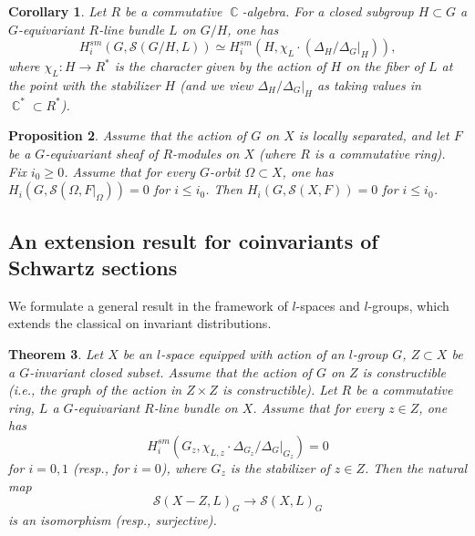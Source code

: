 \documentclass[12pt,reqno]{amsart}
\DeclareMathOperator\C{\mathbb C}
\newtheorem{theorem}{Theorem}[section]
\newtheorem{cor}[theorem]{Corollary}
\newtheorem{prop}[theorem]{Proposition}
\theoremstyle{definition}
\theoremstyle{remark}
\numberwithin{equation}{section}
\newcommand{\De}{\Delta}
\newcommand{\ot}{\otimes}
\newcommand{\Om}{\Omega}
\renewcommand{\SS}{{\mathcal S}}
\newcommand{\sub}{\subset}
\begin{document}
\begin{cor}\label{G/H-R-cor}
Let $R$ be a commutative $\C$-algebra.
For a closed subgroup $H\sub G$ a $G$-equivariant $R$-line bundle $L$ on $G/H$, one has
$$H^{sm}_i(G,\SS(G/H,L))\simeq H^{sm}_i(H,\chi_L\cdot (\De_H/\De_G|_H)),$$
where $\chi_L:H\to R^*$ is the character given by the action of $H$ on the fiber of $L$ at the point with the stabilizer $H$
(and we view $\De_H/\De_G|_H$ as taking values in $\C^*\sub R^*$).
\end{cor}

\begin{prop}\label{hom-van-R-prop}
Assume that the action of $G$ on $X$ is locally separated, and let $F$ be a $G$-equivariant sheaf of $R$-modules on $X$ (where $R$ is a commutative ring). 
Fix $i_0\ge 0$. Assume that for every $G$-orbit $\Om\sub X$, one has
$H_i(G,\SS(\Om,F|_{\Om}))=0$ for $i\le i_0$. Then $H_i(G,\SS(X,F))=0$ for $i\le i_0$.
\end{prop}

\subsection{An extension result for coinvariants of Schwartz sections}

We formulate a general result in the framework of $l$-spaces and $l$-groups, which extends the classical \cite[Thm.\ 6.9]{BZ} on invariant distributions.

\begin{theorem}\label{l-space-coinv-thm}
Let $X$ be an $l$-space equipped with action of an $l$-group $G$, $Z\sub X$ be a $G$-invariant closed subset.
Assume that the action of $G$ on $Z$ is constructible (i.e., the graph of the action in $Z\times Z$ is constructible).
Let $R$ be a commutative ring, $L$ a $G$-equivariant $R$-line bundle on $X$.
Assume that for every $z\in Z$, one has
\begin{equation}\label{hom-van-assumption-eq}
H_{i}^{sm}(G_z,\chi_{L,z}\cdot \De_{G_z}/\De_G|_{G_z})=0
\end{equation}
for $i=0,1$ (resp., for $i=0$), where $G_z$ is the stabilizer of $z\in Z$.
Then the natural map
\begin{equation}\label{X-Z-L-G-map}
\SS(X-Z,L)_{G}\to \SS(X,L)_{G}
\end{equation}
is an isomorphism (resp., surjective).
\end{theorem}
\end{document}
